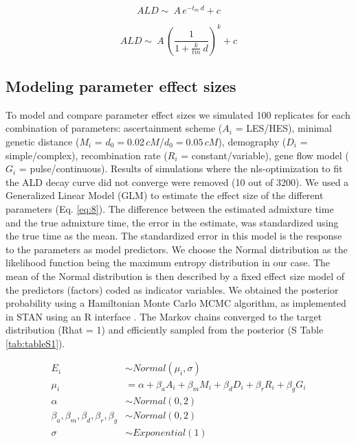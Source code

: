 \documentclass[]{article}
\begin{document}
\begin{equation}
\label{eq:simple_pulse_ccdf}
ALD \sim\ A\,e^{-t_m \:d}+c
\end{equation}

\begin{equation}
\label{eq:extended_pulse_ccdf}
ALD \sim\ A\,\left( \frac{1}{1 + \frac{k}{tm} \:d}\right) ^k+c
\end{equation}


\subsection{Modeling parameter effect sizes}\label{modeling prameter effect sizes}

To model and compare parameter effect sizes we simulated 100
replicates for each combination of
parameters: ascertainment scheme ($A_i$ = LES/HES), minimal genetic distance
($M_i$ = \(d_{0}=0.02\,cM\)/\(d_{0}=0.05\,cM\)), demography ($D_i$ = simple/complex),
recombination rate ($R_i$ = constant/variable), gene flow model
($G_i$ = pulse/continuous). Results of simulations where the nls-optimization to
fit the ALD decay curve did not converge were removed (10 out of 3200).
We used a Generalized Linear Model (GLM)  to estimate the effect
size of the different parameters (Eq.
\ref{eq:8}). The difference between the estimated
admixture time and the true admixture time, the error in the estimate,
was standardized using the true time as the mean. The standardized error in this model is the response to the parameters as model
predictors. We choose the Normal distribution as the likelihood function being the maximum entropy distribution in our case. The mean of the Normal distribution is then described by a fixed effect size model of the predictors (factors) coded as indicator variables. We obtained the posterior probability using a Hamiltonian Monte Carlo MCMC algorithm, as implemented in STAN \citep{carpenter_stan_2017} using an R interface \citep{stan_development_team_rstan_2018,mcelreath_statistical_2020}. The Markov chains converged to the target distribution (Rhat = 1) and efficiently sampled from the posterior (S Table \ref{tab:tableS1}).  

\begin{equation}\label{eq:8}
\begin{split}
E_i &\sim Normal(\mu_i,\sigma) \\
\mu_i &= \alpha + \beta_aA_i + \beta_mM_i + \beta_dD_i + \beta_rR_i + \beta_gG_i \\
\alpha &\sim Normal(0,2) \\
\beta_a,\beta_m,\beta_d,\beta_r,\beta_g &\sim Normal(0,2) \\
\sigma &\sim Exponential(1)
\end{split}
\end{equation}
\end{document}
